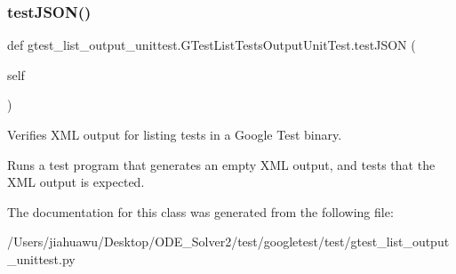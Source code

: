 \subsubsection{\texorpdfstring{test\+J\+S\+O\+N()}{testJSON()}}
{\footnotesize\ttfamily def gtest\+\_\+list\+\_\+output\+\_\+unittest.\+G\+Test\+List\+Tests\+Output\+Unit\+Test.\+test\+J\+S\+ON (\begin{DoxyParamCaption}\item[{}]{self }\end{DoxyParamCaption})}

\begin{DoxyVerb}Verifies XML output for listing tests in a Google Test binary.

Runs a test program that generates an empty XML output, and
tests that the XML output is expected.
\end{DoxyVerb}
 

The documentation for this class was generated from the following file\+:\begin{DoxyCompactItemize}
\item 
/\+Users/jiahuawu/\+Desktop/\+O\+D\+E\+\_\+\+Solver2/test/googletest/test/gtest\+\_\+list\+\_\+output\+\_\+unittest.\+py\end{DoxyCompactItemize}
